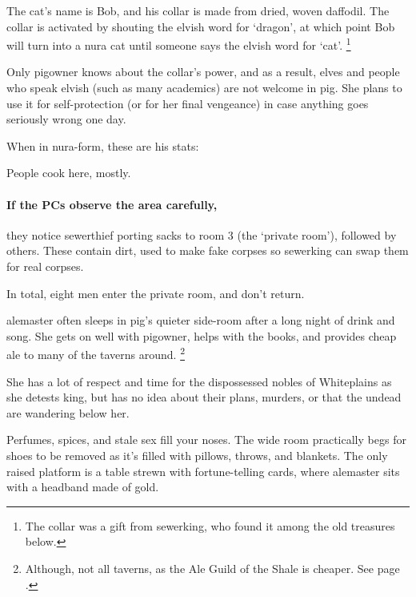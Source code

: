 \begin{multicols}{2}
\begin{boxtext}
\end{boxtext}

The cat's name is Bob, and his collar is made from dried, woven daffodil.  The collar is activated by shouting the elvish word for `dragon', at which point Bob will turn into a nura cat until someone says the elvish word for `cat'.%
\footnote{The collar was a gift from \gls{sewerking}, who found it among the old treasures below.}

Only \gls{pigowner} knows about the collar's power, and as a result, elves and people who speak elvish (such as many academics) are not welcome in \gls{pig}.
She plans to use it for self-protection (or for her final vengeance) in case anything goes seriously wrong one day.

When in nura-form, these are his stats:


\label{pigKitch}

People cook here, mostly.

\paragraph{If the PCs observe the area carefully,}
they notice \gls{sewerthief} porting sacks to room 3 (the `private room'), followed by others.
These contain dirt, used to make fake corpses so \gls{sewerking} can swap them for real corpses.

In total, eight men enter the private room, and don't return.

\pigowner

\label{pigPrivate}

\Gls{alemaster} often sleeps in \gls{pig}'s quieter side-room after a long night of drink and song.
She gets on well with \gls{pigowner}, helps with the books, and provides cheap ale to many of the taverns around.%
\footnote{Although, not all taverns, as the Ale Guild of the Shale is cheaper.
See page \pageref{troubleAle}.}

She has a lot of respect and time for the dispossessed nobles of Whiteplains as she detests \gls{king}, but has no idea about their plans, murders, or that the undead are wandering below her.

\begin{boxtext}

  Perfumes, spices, and stale sex fill your noses.
  The wide room practically begs for shoes to be removed as it's filled with pillows, throws, and blankets.
  The only raised platform is a table strewn with fortune-telling cards, where \gls{alemaster} sits with a headband made of gold.


\end{boxtext}
\end{multicols}
